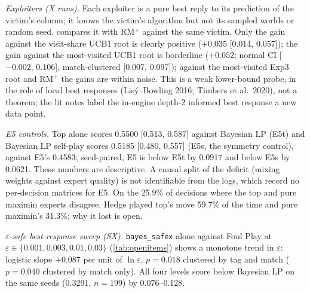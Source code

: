 \documentclass[10pt]{article}
\theoremstyle{plain}
\theoremstyle{definition}
\theoremstyle{remark}
\begin{document}
\emph{Exploiters (X runs).} Each exploiter is a pure best reply to its prediction of the victim's column; it knows the
victim's algorithm but not its sampled worlds or random seed.  compares it with RM$^+$ against the same
victim. Only the gain against the visit-share UCB1 root is clearly positive (+0.035 [0.014, 0.057]); the gain against the most-visited UCB1 root is borderline ($+0.052$; normal CI [$-0.002$, 0.106], match-clustered [0.007, 0.097]); against the most-visited Exp3 root and RM$^+$ the gains are within noise. This is a weak lower-bound probe, in the role of local best responses (Lisý--Bowling 2016; Timbers et al.\
2020), not a theorem; the lit notes label the in-engine depth-2 informed best response a new data point.

\emph{E5 controls.} Top alone scores 0.5500 [0.513, 0.587] against Bayesian LP (E5t) and Bayesian LP self-play scores
0.5185 [0.480, 0.557] (E5s, the symmetry control), against E5's 0.4583; seed-paired, E5 is below E5t by 0.0917 and
below E5s by 0.0621. These numbers are descriptive. A causal split of the deficit (mixing weights against expert
quality) is not identifiable from the logs, which record no per-decision matrices for E5. On the 25.9\% of decisions
where the top and pure maximin experts disagree, Hedge played top's move 59.7\% of the time and pure maximin's 31.3\%; why it
lost is open.

\emph{$\varepsilon$-safe best-response sweep (SX).} \texttt{bayes\_safex} alone against Foul Play at $\varepsilon\in\{0.001,0.003,0.01,0.03\}$
(\cref{tab:openitems}) shows a monotone trend in $\varepsilon$: logistic slope $+0.087$ per unit of $\ln\varepsilon$, $p=0.018$
clustered by tag and match ($p=0.040$ clustered by match only). All four levels score below Bayesian LP on the same
seeds (0.3291, $n=199$) by 0.076--0.128.
\end{document}
